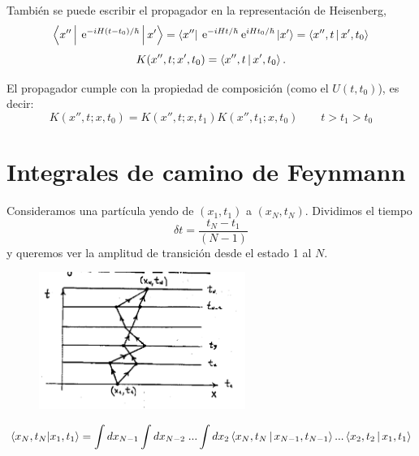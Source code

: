 \documentclass[10pt,oneside]{CBFT_book}
\begin{document}
También se puede escribir el propagador en la representación de Heisenberg,
\[
	\Braket{x''|\:\mathrm{e}^{-iH(t-t_0)/\hbar}|x'} = \Bra{x''}\:\mathrm{e}^{-iHt/\hbar} \:\mathrm{e}^{iHt_0/\hbar}\Ket{x'}=
		\Braket{x'',t|x',t_0}
\]
\[
	K(x'',t;x',t_0) = \Braket{x'',t | x',t_0}.
\]

El propagador cumple con la propiedad de composición (como el $U(t,t_0)$), es decir:
\[
	K(x'',t; x, t_0) = K(x'',t; x, t_1)K(x'',t_1; x, t_0) \qquad t>t_1>t_0
\]

\section{Integrales de camino de Feynmann}

Consideramos una partícula yendo de $(x_1,t_1)$ a $(x_N,t_N)$. Dividimos el tiempo 
\[
	\delta t = \frac{t_N-t_1}{(N-1)}
\]
y queremos ver la amplitud de transición desde el estado 1 al $N$.

\begin{figure}[htb]
	\begin{center}
	\includegraphics[width=0.6\textwidth]{images/teo2_8.pdf}	 
	\end{center}
	\caption{}
\end{figure} 

\[
	\braket{x_N,t_N|x_1,t_1} = \int dx_{N-1}\int dx_{N-2} \; ...\int dx_2
	\Braket{x_N,t_N|x_{N-1},t_{N-1}} ...\Braket{x_2,t_2|x_1,t_1}
\]
\end{document}
